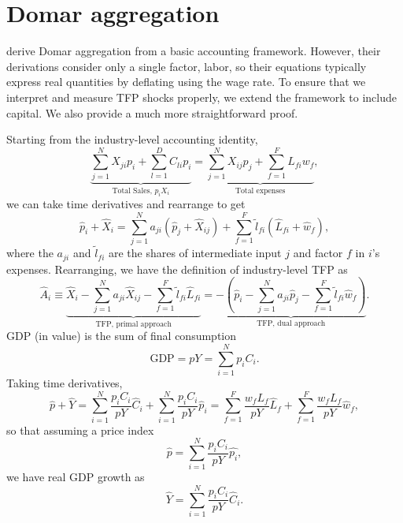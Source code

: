 
\section{Domar aggregation}
\label{appendix:domar_aggregation}

\citet{mcnerneyHowProductionNetworks2022} derive Domar aggregation from a basic accounting framework. However, their derivations consider only a single factor, labor, so their equations typically express real quantities by deflating using the wage rate. To ensure that we interpret and measure TFP shocks properly, we extend the framework to include capital. We also provide a much more straightforward proof.

Starting from the industry-level accounting identity,
\[
\underbrace{\sum_{j=1}^N X_{ji} p_i + \sum_{l=1}^D C_{li} p_i}_{\text{Total Sales, }p_iX_i} = \underbrace{\sum_{j=1}^N X_{ij} p_j + \sum_{f=1}^F L_{fi}w_f}_{\text{Total expenses}},
\]
we can take time derivatives and rearrange to get
\[
\hat{p}_i + \hat{X}_i = \sum_{j=1}^N  a_{ji} (\hat{p}_j + \hat{X}_{ij}) + \sum_{f=1}^F \tilde{l}_{fi}(\hat{L}_{fi} + \hat{w}_f),
\]
where the $a_{ji}$ and $\tilde{l}_{fi}$ are the shares of intermediate input $j$ and factor $f$ in $i$'s expenses. Rearranging, we have the definition of industry-level TFP as
\begin{equation}
\label{eq_A1_TFP_primal_dual}
\hat{A}_i \equiv \underbrace{\hat{X}_i - \sum_{j=1}^N  a_{ji} \hat{X}_{ij} - \sum_{f=1}^F \tilde{l}_{fi}\hat{L}_{fi}}_{\text{TFP, primal approach}} = \underbrace{- \left( \hat{p}_i - \sum_{j=1}^N  a_{ji} \hat{p}_j - \sum_{f=1}^F \tilde{l}_{fi} \hat{w}_f \right)}_{\text{TFP, dual approach}}.
\label{eq:appendix_primal_dual}
\end{equation}
GDP (in value) is the sum of final consumption
\begin{equation}
\text{GDP}=pY=\sum_{i=1}^N p_i C_i.
\label{eq:gdp_value}
\end{equation}
Taking time derivatives,
\begin{equation}
\hat{p} + \hat{Y} = \sum_{i=1}^N \frac{p_i C_i}{pY} \hat{C}_i + \sum_{i=1}^N \frac{p_i C_i}{pY} \hat{p}_i  = \sum_{f=1}^F \frac{w_f L_f}{pY} \hat{L}_f + \sum_{f=1}^F \frac{w_f L_f}{pY} \hat{w}_f,
\label{eq:gdp_value_derivative}
\end{equation}
so that assuming a price index
\[
\hat{p} = \sum_{i=1}^N \frac{p_i C_i}{pY} \hat{p_i},
\]
we have real GDP growth as
\begin{equation}
\hat{Y} = \sum_{i=1}^N \frac{p_i C_i}{pY} \hat{C}_i.
\label{eq:real_gdp_growth}
\end{equation}

